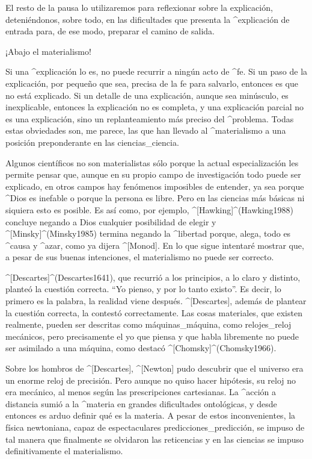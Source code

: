 El resto de la pausa lo utilizaremos para reflexionar sobre la
explicación, deteniéndonos, sobre todo, en las dificultades que presenta
la ^{explicación de entrada} para, de ese modo, preparar el camino de
salida.


\Section ¡Abajo el materialismo!

Si una ^{explicación} lo es, no puede recurrir a ningún acto de ^{fe}.
Si un paso de la explicación, por pequeño que sea, precisa de la fe para
salvarlo, entonces es que no está explicado. Si un detalle de una
explicación, aunque sea minúsculo, es inexplicable, entonces la
explicación no es completa, y una explicación parcial no es una
explicación, sino un replanteamiento más preciso del ^{problema}. Todas
estas obviedades son, me parece, las que han llevado al ^{materialismo}
a una posición preponderante en las ciencias_{ciencia}.

Algunos científicos no son materialistas sólo porque la actual
especialización les permite pensar que, aunque en su propio campo de
investigación todo puede ser explicado, en otros campos hay fenómenos
imposibles de entender, ya sea porque ^{Dios} es inefable o porque la
persona es libre. Pero en las ciencias más básicas ni siquiera esto es
posible. Es así como, por ejemplo, ^[Hawking]^(Hawking1988) concluye
negando a Dios cualquier posibilidad de elegir y ^[Minsky]^(Minsky1985)
termina negando la ^{libertad} porque, alega, todo es ^{causa} y
^{azar}, como ya dijera ^[Monod]. En lo que sigue intentaré mostrar que,
a pesar de sus buenas intenciones, el materialismo no puede ser
correcto.


^[Descartes]^(Descartes1641), que recurrió a los principios, a lo claro
y distinto, planteó la cuestión correcta. ``Yo pienso, y por lo tanto
existo''. Es decir, lo primero es la palabra, la realidad viene después.
^[Descartes], además de plantear la cuestión correcta, la contestó
correctamente. Las cosas materiales, que existen realmente, pueden ser
descritas como máquinas_{máquina}, como relojes_{reloj} mecánicos, pero
precisamente el yo que piensa y que habla libremente no puede ser
asimilado a una máquina, como destacó ^[Chomsky]^(Chomsky1966).

Sobre los hombros de ^[Descartes], ^[Newton] pudo descubrir que el
universo era un enorme reloj de precisión. Pero aunque no quiso hacer
hipótesis, su reloj no era mecánico, al menos según las prescripciones
cartesianas. La ^{acción a distancia} sumió a la ^{materia} en grandes
dificultades ontológicas, y desde entonces es arduo definir qué es la
materia. A pesar de estos inconvenientes, la física newtoniana, capaz de
espectaculares predicciones_{predicción}, se impuso de tal manera que
finalmente se olvidaron las reticencias y en las ciencias se impuso
definitivamente el materialismo.

